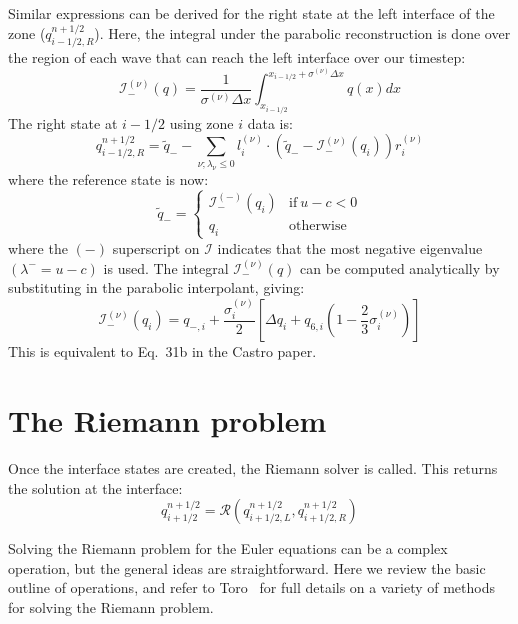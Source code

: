 Similar expressions can be derived for the right state at the left interface
of the zone ($q_{i-1/2,R}^{n+1/2}$).  Here, the integral under the parabolic
reconstruction is done over the region of each wave that can reach the left 
interface over our timestep:
\begin{equation}
\mathcal{I}_-^{(\nu)}(q) = \frac{1}{\sigma^{(\nu)} \Delta x}
  \int_{x_{i-1/2}}^{x_{i-1/2} + \sigma^{(\nu)} \Delta x} q(x) dx
\end{equation}
The right state at $i-1/2$ using zone $i$ data is:
\begin{equation}
q_{i-1/2,R}^{n+1/2} = \tilde{q}_- - \sum_{\nu; \lambda_\nu \le 0}
   l_i^{(\nu)} \cdot \left ( \tilde{q}_- - \mathcal{I}_-^{(\nu)}(q_i) \right ) r_i^{(\nu)}
\end{equation}
where the reference state is now:
\begin{equation}
\tilde{q}_- = \left \{ \begin{array}{cc}
   \mathcal{I}_-^{(-)}(q_i) & \mathrm{if~} u - c < 0 \\
    q_i                   & \mathrm{otherwise}
\end{array} \right .
\end{equation}
where the $(-)$ superscript on $\mathcal{I}$ indicates that the most
negative eigenvalue $(\lambda^- = u - c)$ is used.  The integral
$\mathcal{I}_-^{(\nu)}(q)$ can be computed analytically by
substituting in the parabolic interpolant, giving:
\begin{equation}
\mathcal{I}_-^{(\nu)}(q_i) = q_{-,i} + \frac{\sigma_i^{(\nu)}}{2}
   \left [ \Delta q_i + q_{6,i} \left ( 1 - \frac{2}{3} \sigma_i^{(\nu)} \right ) \right ]
\end{equation}
This is equivalent to Eq.~31b in the Castro paper.

\section{The Riemann problem}

Once the interface states are created, the Riemann solver is called.  This 
returns the solution at the interface:
\begin{equation}
q_{i+1/2}^{n+1/2} = \mathcal{R}(q_{i+1/2,L}^{n+1/2}, q_{i+1/2,R}^{n+1/2})
\end{equation}

Solving the Riemann problem for the Euler equations can be a complex
operation, but the general ideas are straightforward.  Here we review
the basic outline of operations, and refer to Toro~\cite{toro:1997} for
full details on a variety of methods for solving the Riemann problem.

